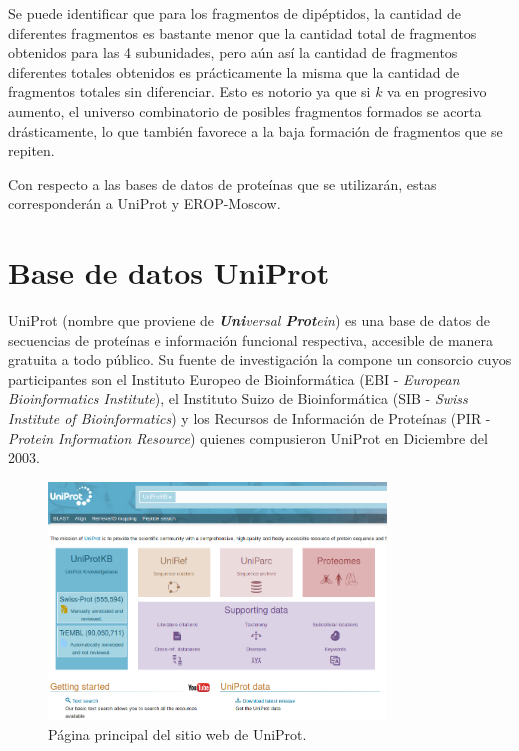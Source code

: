Se puede identificar que para los fragmentos de dipéptidos, la cantidad de diferentes fragmentos es bastante menor que la cantidad total de fragmentos obtenidos para las 4 subunidades, pero aún así la cantidad de fragmentos diferentes totales obtenidos es prácticamente la misma que la cantidad de fragmentos totales sin diferenciar. Esto es notorio ya que si $k$ va en progresivo aumento, el universo combinatorio de posibles fragmentos formados se acorta drásticamente, lo que también favorece a la baja formación de fragmentos que se repiten.

Con respecto a las bases de datos de proteínas que se utilizarán, estas corresponderán a UniProt y EROP-Moscow. 

\section{Base de datos UniProt}

UniProt (nombre que proviene de \textit{\textbf{Uni}versal \textbf{Prot}ein}) es una base de datos de secuencias de proteínas e información funcional respectiva, accesible de manera gratuita a todo público. Su fuente de investigación la compone un consorcio cuyos participantes son el Instituto Europeo de Bioinformática (EBI - \textit{European Bioinformatics Institute}), el Instituto Suizo de Bioinformática (SIB - \textit{Swiss Institute of Bioinformatics}) y los Recursos de Información de Proteínas (PIR - \textit{Protein Information Resource}) quienes compusieron UniProt en Diciembre del 2003.

\begin{figure}[h]
    \centering
    \includegraphics[width=0.8\textwidth]{./images/uniprot_main.png}
    \caption{Página principal del sitio web de UniProt.}
    \label{fig:image7}
\end{figure}

